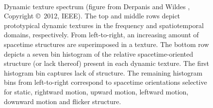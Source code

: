 \begin{figure}[t]
\begin{center}
	\\
	\caption[Spacetime texture spectrum]{Dynamic texture spectrum (figure from Derpanis and Wildes \cite{derpanis2012spacetime}, Copyright \copyright\ 2012, IEEE). The top and middle rows depict prototypical dynamic textures in the frequency and spatiotemporal domains, respectively. From left-to-right, an increasing amount of spacetime structures are superimposed in a texture. The bottom row depicts a seven bin histogram of the relative spacetime-oriented structure (or lack thereof) present in each dynamic texture. The first histogram bin captures lack of structure. The remaining histogram bins from left-to-right correspond to spacetime orientations selective for static, rightward motion, upward motion, leftward motion, downward motion and flicker structure.}
	\vspace{-0.65cm}
	\label{fig:spacetime_structures}
\end{center}
\end{figure}